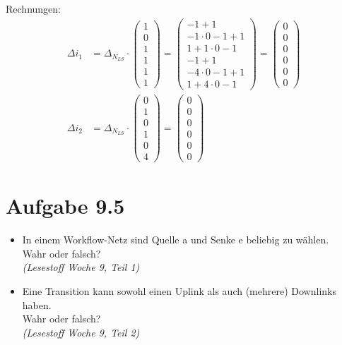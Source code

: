 \documentclass[12pt, paper=a4]{article}
\begin{document}
Rechnungen:\\
\begin{align*}
\Delta i_1 &= \Delta_{N_{LS}} \cdot \begin{pmatrix}1 \\ 0 \\ 1 \\ 1 \\ 1 \\ 1\end{pmatrix} = 
\begin{pmatrix}-1+1 \\ -1 \cdot 0-1+1\\ 1+1 \cdot 0-1 \\ -1+1 \\ -4 \cdot 0-1+1 \\ 1+4 \cdot 0-1\end{pmatrix} = 
\begin{pmatrix}0 \\ 0 \\ 0 \\ 0 \\ 0 \\ 0\end{pmatrix}
\\
\Delta i_2 &= \Delta_{N_{LS}} \cdot \begin{pmatrix}0 \\ 1 \\ 0 \\ 1 \\ 0 \\ 4\end{pmatrix} = 
\begin{pmatrix}0 \\ 0 \\ 0 \\ 0 \\ 0 \\ 0\end{pmatrix}
\end{align*}

\section*{Aufgabe 9.5}
	\begin{itemize}
	\item In einem Workflow-Netz sind Quelle a und Senke e beliebig zu w\"ahlen.\\
		Wahr oder falsch?\\
		\textit{(Lesestoff Woche 9, Teil 1)}
	\item Eine Transition kann sowohl einen Uplink als auch (mehrere) Downlinks haben.\\
		Wahr oder falsch?\\
		\textit{(Lesestoff Woche 9, Teil 2)}
	\end{itemize}
\end{document}

